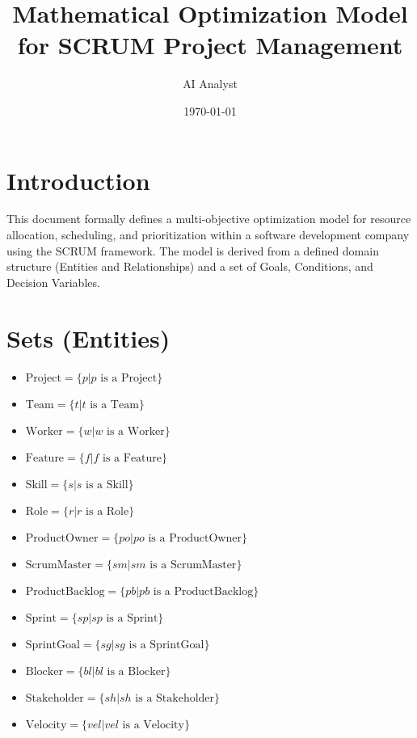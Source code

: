 \documentclass[11pt]{article}
\title{Mathematical Optimization Model for SCRUM Project Management}
\author{AI Analyst}
\date{\today}
\begin{document}
\maketitle
\tableofcontents
\newpage

\section*{Introduction}
This document formally defines a multi-objective optimization model for resource allocation, scheduling, and prioritization within a software development company using the SCRUM framework. The model is derived from a defined domain structure (Entities and Relationships) and a set of Goals, Conditions, and Decision Variables.

\section{Sets (Entities)}
\begin{itemize}
    \item $\text{Project} = \{p | p \text{ is a Project}\}$
    \item $\text{Team} = \{t | t \text{ is a Team}\}$
    \item $\text{Worker} = \{w | w \text{ is a Worker}\}$
    \item $\text{Feature} = \{f | f \text{ is a Feature}\}$
    \item $\text{Skill} = \{s | s \text{ is a Skill}\}$
    \item $\text{Role} = \{r | r \text{ is a Role}\}$
    \item $\text{ProductOwner} = \{po | po \text{ is a ProductOwner}\}$
    \item $\text{ScrumMaster} = \{sm | sm \text{ is a ScrumMaster}\}$
    \item $\text{ProductBacklog} = \{pb | pb \text{ is a ProductBacklog}\}$
    \item $\text{Sprint} = \{sp | sp \text{ is a Sprint}\}$
    \item $\text{SprintGoal} = \{sg | sg \text{ is a SprintGoal}\}$
    \item $\text{Blocker} = \{bl | bl \text{ is a Blocker}\}$
    \item $\text{Stakeholder} = \{sh | sh \text{ is a Stakeholder}\}$
    \item $\text{Velocity} = \{vel | vel \text{ is a Velocity}\}$
\end{itemize}
\end{document}
